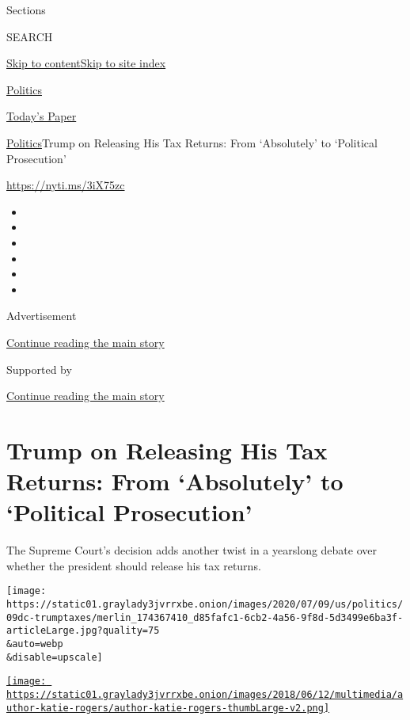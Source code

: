 Sections

SEARCH

\protect\hyperlink{site-content}{Skip to
content}\protect\hyperlink{site-index}{Skip to site index}

\href{https://www.nytimes3xbfgragh.onion/section/politics}{Politics}

\href{https://myaccount.nytimes3xbfgragh.onion/auth/login?response_type=cookie\&client_id=vi}{}

\href{https://www.nytimes3xbfgragh.onion/section/todayspaper}{Today's
Paper}

\href{/section/politics}{Politics}\textbar{}Trump on Releasing His Tax
Returns: From `Absolutely' to `Political Prosecution'

\url{https://nyti.ms/3iX75zc}

\begin{itemize}
\item
\item
\item
\item
\item
\item
\end{itemize}

Advertisement

\protect\hyperlink{after-top}{Continue reading the main story}

Supported by

\protect\hyperlink{after-sponsor}{Continue reading the main story}

\hypertarget{trump-on-releasing-his-tax-returns-from-absolutely-to-political-prosecution}{%
\section{Trump on Releasing His Tax Returns: From `Absolutely' to
`Political
Prosecution'}\label{trump-on-releasing-his-tax-returns-from-absolutely-to-political-prosecution}}

The Supreme Court's decision adds another twist in a yearslong debate
over whether the president should release his tax returns.

\texttt{[image: https://static01.graylady3jvrrxbe.onion/images/2020/07/09/us/politics/09dc-trumptaxes/merlin\_174367410\_d85fafc1-6cb2-4a56-9f8d-5d3499e6ba3f-articleLarge.jpg?quality=75\\\&auto=webp\\\&disable=upscale]}

\href{https://www.nytimes3xbfgragh.onion/by/katie-rogers}{\texttt{[image: https://static01.graylady3jvrrxbe.onion/images/2018/06/12/multimedia/author-katie-rogers/author-katie-rogers-thumbLarge-v2.png]}}

